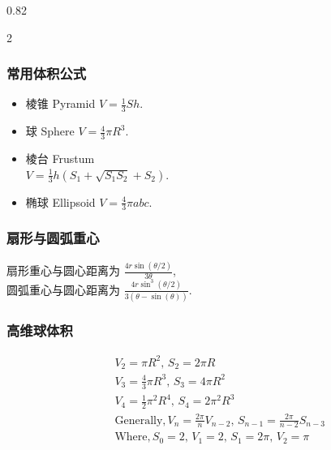 \begin{small}
\begin{spacing}{0.82}
\begin{multicols*}{2}
\subsubsection{常用体积公式}
\begin{itemize}
\item 棱锥 Pyramid $V=\frac{1}{3}Sh$.
\item 球 Sphere $V=\frac{4}{3}\pi R^3$.
\item 棱台 Frustum \\ $V=\frac{1}{3}h(S_1+\sqrt {S_1S_2}+S_2)$.
\item 椭球 Ellipsoid $V=\frac{4}{3} \pi abc$.
\end{itemize}
\subsubsection{扇形与圆弧重心}
扇形重心与圆心距离为 $\frac{4r\sin(\theta/2)}{3\theta}$,\\
圆弧重心与圆心距离为 $\frac{4r\sin^3(\theta/2)}{3(\theta-\sin(\theta))}$.
\end{multicols*}
\subsubsection{高维球体积}
\begin{eqnarray*}
&& V_2=\pi R^2,\, S_2=2\pi R \\
&& V_3=\frac{4}{3}\pi R^3,\, S_3=4\pi R^2 \\
&& V_4=\frac{1}{2}\pi ^2 R^4,\, S_4=2\pi ^2 R^3 \\
&& \mathrm{Generally}, V_n=\frac{2\pi}{n}V_{n-2},\, S_{n-1}=\frac{2\pi}{n-2}S_{n-3} \\
&& \mathrm{Where}, S_0=2,\, V_1=2,\, S_1=2\pi ,\, V_2=\pi
\end{eqnarray*}
\end{spacing}
\end{small}
